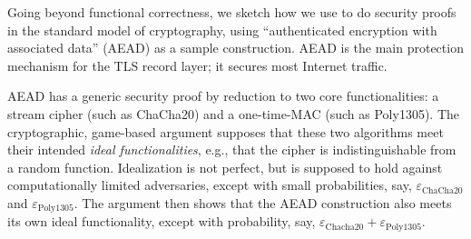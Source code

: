 
Going beyond functional correctness, we sketch how we use \lowstar
to do security proofs in the standard model of cryptography, using
``authenticated encryption with associated data'' (AEAD) as a
sample construction. %
%
AEAD is the main protection mechanism for the TLS record layer; it
secures most Internet traffic.

AEAD has a generic security proof by reduction to two core
functionalities: a stream cipher (such as ChaCha20) and a one-time-MAC
(such as Poly1305).
%
The cryptographic, game-based argument supposes that these two
algorithms meet their intended \emph{ideal functionalities}, e.g.,
that the cipher is indistinguishable from a random function.
%
Idealization is not perfect, but is supposed to hold against
computationally limited adversaries, except with small probabilities,
say, $\varepsilon_\mathrm{ChaCha20}$ and $\varepsilon_\mathrm{Poly1305}$.
%
The argument then shows that the AEAD construction also meets its own
ideal functionality, except with probability, say, $\varepsilon_\mathrm{Chacha20} +
\varepsilon_\mathrm{Poly1305}$.

